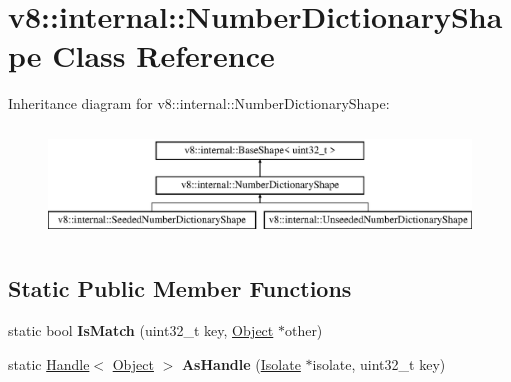 \hypertarget{classv8_1_1internal_1_1_number_dictionary_shape}{}\section{v8\+:\+:internal\+:\+:Number\+Dictionary\+Shape Class Reference}
\label{classv8_1_1internal_1_1_number_dictionary_shape}
Inheritance diagram for v8\+:\+:internal\+:\+:Number\+Dictionary\+Shape\+:\begin{figure}[H]
\begin{center}
\leavevmode
\includegraphics[height=2.978723cm]{classv8_1_1internal_1_1_number_dictionary_shape}
\end{center}
\end{figure}
\subsection*{Static Public Member Functions}
\begin{DoxyCompactItemize}
\item 
\hypertarget{classv8_1_1internal_1_1_number_dictionary_shape_a7110bfdac2c92ff9645904abb455c88e}{}static bool {\bfseries Is\+Match} (uint32\+\_\+t key, \hyperlink{classv8_1_1internal_1_1_object}{Object} $\ast$other)\label{classv8_1_1internal_1_1_number_dictionary_shape_a7110bfdac2c92ff9645904abb455c88e}

\item 
\hypertarget{classv8_1_1internal_1_1_number_dictionary_shape_a97e4b380de528fd2c60023fb7fbdcb6a}{}static \hyperlink{classv8_1_1internal_1_1_handle}{Handle}$<$ \hyperlink{classv8_1_1internal_1_1_object}{Object} $>$ {\bfseries As\+Handle} (\hyperlink{classv8_1_1internal_1_1_isolate}{Isolate} $\ast$isolate, uint32\+\_\+t key)\label{classv8_1_1internal_1_1_number_dictionary_shape_a97e4b380de528fd2c60023fb7fbdcb6a}

\end{DoxyCompactItemize}
